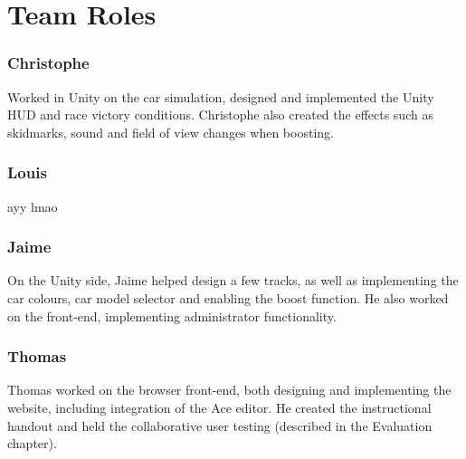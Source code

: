 \iffalse
Since we using git for our version control, and Github as our host for the project, we made use of Github's in-built issue tracking system. (Currently we use Trello to flag up issues, sometimes breaking our task board story-system by making a new card just for the issue. Using a dedicated system could help organise what problems we are having, in particular which issues are preventing further work from being completed. However, Github's 'Issues' feature isn't just restricted to bug fixes; it can be used for enhancements and keeping track of who is working on what, so it might be worth using this as an alternative, or in addition to Trello.) (Did we even use this?)
\fi

\section{Team Roles}
\subsubsection{Christophe}
Worked in Unity on the car simulation, designed and implemented the Unity HUD and race victory conditions. Christophe also created the effects such as skidmarks, sound and field of view changes when boosting.

\subsubsection{Louis}
ayy lmao

\subsubsection{Jaime}
On the Unity side, Jaime helped design a few tracks, as well as implementing the car colours, car model selector and enabling the boost function. He also worked on the front-end, implementing administrator functionality.  


\subsubsection{Thomas}
Thomas worked on the browser front-end, both designing and implementing the website, including integration of the Ace editor. He created the instructional handout and held the collaborative user testing (described in the Evaluation chapter).